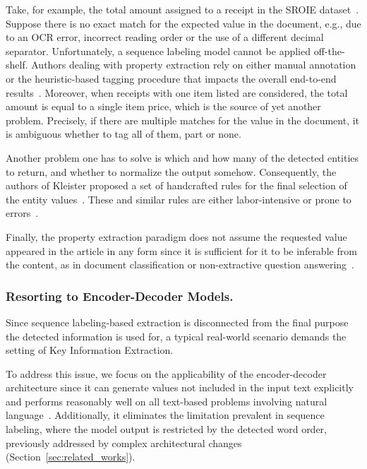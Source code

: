 \documentclass[runningheads]{llncs}
\begin{document}
Take, for example, the total amount assigned to a receipt in the SROIE dataset~\cite{Huang2019ICDAR2019CO}. Suppose there is no exact match for the expected value in the document, e.g., due to an OCR error, incorrect reading order or the use of a different decimal separator. Unfortunately, a sequence labeling model cannot be applied off-the-shelf. Authors dealing with property extraction rely on either manual annotation or the heuristic-based tagging procedure that impacts the overall end-to-end results~\cite{xu2020layoutlm,gralinski2020kleister,garncarek2020lambert,hong2021bros,xu2020layoutlmv2,liu2019graph}. Moreover, when receipts with one item listed are considered, the total amount is equal to a single item price, which is the source of yet another problem. Precisely, if there are multiple matches for the value in the document, it is ambiguous whether to tag all of them, part or none.


Another problem one has to solve is which and how many of the detected entities to return, and whether to normalize the output somehow. Consequently, the authors of Kleister proposed a set of handcrafted rules for the final selection of the entity values~\cite{gralinski2020kleister}.
These and similar rules are either labor-intensive or prone to errors~\cite{8270005}.

Finally, the property extraction paradigm does not assume the requested value appeared in the article in any form since it is sufficient for it to be inferable from the content, as in document classification or non-extractive question answering~\cite{dwojak-etal-2020-dataset}. 

\subsubsection{Resorting to Encoder-Decoder Models.}
Since sequence labeling-based extraction is disconnected from the final purpose the detected information is used for, a typical real-world scenario demands the setting of Key Information Extraction.

To address this issue, we focus on the applicability of the encoder-decoder architecture since it can generate values not included in the input text explicitly~\cite{hewlett-etal-2016-wikireading} and performs reasonably well on all text-based problems involving natural language~\cite{2020t5}. Additionally, it eliminates the limitation prevalent in sequence labeling, where the model output is restricted by the detected word order, previously addressed by complex architectural changes (Section~\ref{sec:related_works}).
\end{document}
